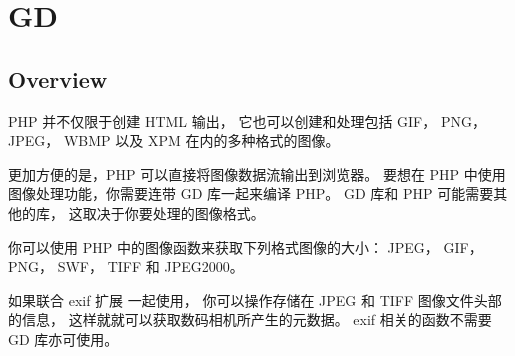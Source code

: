 \part{GD}


\chapter{Overview}



PHP 并不仅限于创建 HTML 输出， 它也可以创建和处理包括 GIF， PNG， JPEG， WBMP 以及 XPM 在内的多种格式的图像。


更加方便的是，PHP 可以直接将图像数据流输出到浏览器。 要想在 PHP 中使用图像处理功能，你需要连带 GD 库一起来编译 PHP。 GD 库和 PHP 可能需要其他的库， 这取决于你要处理的图像格式。

你可以使用 PHP 中的图像函数来获取下列格式图像的大小： JPEG， GIF， PNG， SWF， TIFF 和 JPEG2000。

如果联合 exif 扩展 一起使用， 你可以操作存储在 JPEG 和 TIFF 图像文件头部的信息， 这样就就可以获取数码相机所产生的元数据。 exif 相关的函数不需要 GD 库亦可使用。